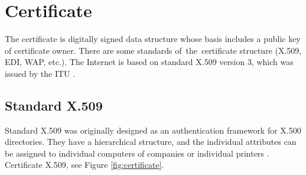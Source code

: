 \documentclass[
  twoside, 12pt, 
  printed, %
  notable,   %
  lof,     %
  lot,     %
]{fithesis3}
\begin{document}
\section{Certificate}
The certificate is digitally signed data structure whose basis includes a public key of
certificate owner. There are some standards of~the~certificate structure (X.509, EDI, WAP, 
etc.). The Internet is based on standard X.509 version 3, which was issued by the ITU 
\cite{dostalek2016velky}. %

\subsection{Standard X.509}
Standard X.509 was originally designed as an authentication framework for X.500 
directories. They have a hierarchical structure, and the individual attributes can be assigned to 
individual computers of companies or individual printers \cite{schmeh2006cryptography}. %
Certificate X.509, see Figure \ref{fig:certificate}.
\end{document}
